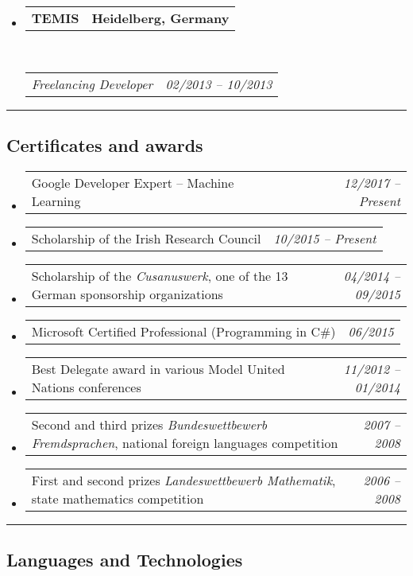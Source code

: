 \documentclass[10pt,letterpaper]{article}
\makeatletter
\newcommand{\headerrow}[2]
{\begin{tabular*}{\linewidth}{l@{\extracolsep{\fill}}r}
	#1 &
	#2 \\
\end{tabular*}}
\makeatother
\begin{document}
\begin{itemize}
	\item
	\headerrow
		{\textbf{TEMIS}}
		{\textbf{Heidelberg, Germany}}
	\\
	\headerrow
		{\emph{Freelancing Developer}}
		{\emph{02/2013 -- 10/2013}}

\end{itemize}


\hrule
\vspace{-0.4em}
\subsection*{Certificates and awards}

\begin{itemize}
	\parskip=0.1em
	
	\item 
	\headerrow
		{Google Developer Expert -- Machine Learning}
		{\emph{12/2017 -- Present}}
	\item 
	\headerrow
		{Scholarship of the Irish Research Council}
		{\emph{10/2015 -- Present}}
	\item 
	\headerrow
		{Scholarship of the \emph{Cusanuswerk}, one of the 13 German sponsorship organizations}
		{\emph{04/2014 -- 09/2015}}	
	\item 
	\headerrow
		{Microsoft Certified Professional (Programming in C\#)}
		{\emph{06/2015}}
	\item 
	\headerrow
		{Best Delegate award in various Model United Nations conferences}
		{\emph{11/2012 -- 01/2014}}
	\item 
	\headerrow
		{Second and third prizes \emph{Bundeswettbewerb Fremdsprachen}, national foreign languages competition}
		{\emph{2007 -- 2008}}
	\item 
	\headerrow
		{First and second prizes \emph{Landeswettbewerb Mathematik}, state mathematics competition}
		{\emph{2006 -- 2008}}
	

\end{itemize}

\hrule
\vspace{-0.4em}
\subsection*{Languages and Technologies}
\end{document}
